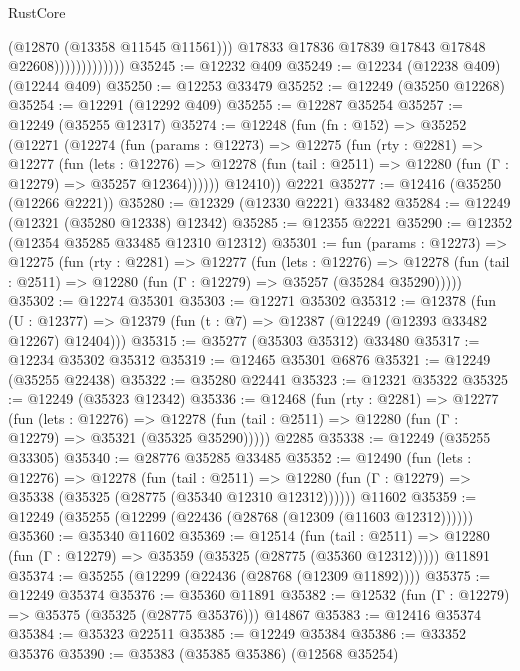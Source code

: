 \begin{lexlean}{RustCore}
\begin{coremodule}
                                (@12870 (@13358 @11545 @11561)))
                              @17833
                              @17836
                              @17839
                              @17843
                              @17848
                              @22608)))))))))))))
@35245 := @12232 @409
@35249 := @12234 (@12238 @409) (@12244 @409)
@35250 := @12253 @33479
@35252 := @12249 (@35250 @12268)
@35254 := @12291 (@12292 @409)
@35255 := @12287 @35254
@35257 := @12249 (@35255 @12317)
@35274 := @12248
    (fun (fn : @152) =>
    @35252
      (@12271
        (@12274
          (fun (params : @12273) =>
          @12275
            (fun (rty : @2281) =>
            @12277
              (fun (lets : @12276) =>
              @12278 (fun (tail : @2511) => @12280 (fun (Γ : @12279) => @35257 @12364))))))
        @12410))
    @2221
@35277 := @12416 (@35250 (@12266 @2221))
@35280 := @12329 (@12330 @2221) @33482
@35284 := @12249 (@12321 (@35280 @12338) @12342)
@35285 := @12355 @2221
@35290 := @12352 (@12354 @35285 @33485 @12310 @12312)
@35301 := fun (params : @12273) =>
  @12275
    (fun (rty : @2281) =>
    @12277
      (fun (lets : @12276) =>
      @12278 (fun (tail : @2511) => @12280 (fun (Γ : @12279) => @35257 (@35284 @35290)))))
@35302 := @12274 @35301
@35303 := @12271 @35302
@35312 := @12378
    (fun (U : @12377) => @12379 (fun (t : @7) => @12387 (@12249 (@12393 @33482 @12267) @12404)))
@35315 := @35277 (@35303 @35312) @33480
@35317 := @12234 @35302 @35312
@35319 := @12465 @35301 @6876
@35321 := @12249 (@35255 @22438)
@35322 := @35280 @22441
@35323 := @12321 @35322
@35325 := @12249 (@35323 @12342)
@35336 := @12468
    (fun (rty : @2281) =>
    @12277
      (fun (lets : @12276) =>
      @12278 (fun (tail : @2511) => @12280 (fun (Γ : @12279) => @35321 (@35325 @35290)))))
    @2285
@35338 := @12249 (@35255 @33305)
@35340 := @28776 @35285 @33485
@35352 := @12490
    (fun (lets : @12276) =>
    @12278
      (fun (tail : @2511) =>
      @12280 (fun (Γ : @12279) => @35338 (@35325 (@28775 (@35340 @12310 @12312))))))
    @11602
@35359 := @12249 (@35255 (@12299 (@22436 (@28768 (@12309 (@11603 @12312))))))
@35360 := @35340 @11602
@35369 := @12514
    (fun (tail : @2511) => @12280 (fun (Γ : @12279) => @35359 (@35325 (@28775 (@35360 @12312)))))
    @11891
@35374 := @35255 (@12299 (@22436 (@28768 (@12309 @11892))))
@35375 := @12249 @35374
@35376 := @35360 @11891
@35382 := @12532 (fun (Γ : @12279) => @35375 (@35325 (@28775 @35376))) @14867
@35383 := @12416 @35374
@35384 := @35323 @22511
@35385 := @12249 @35384
@35386 := @33352 @35376
@35390 := @35383 (@35385 @35386) (@12568 @35254)

\end{coremodule}
\end{lexlean}
